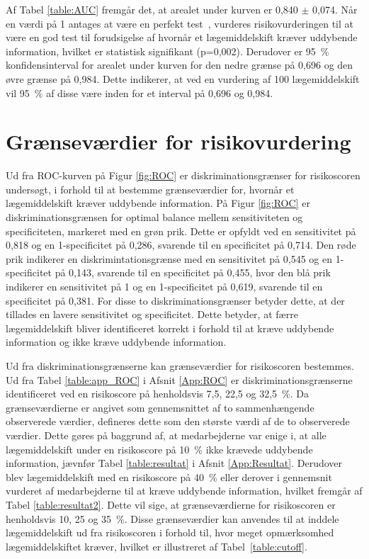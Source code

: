 Af Tabel \ref{table:AUC} fremgår det, at arealet under kurven er 0,840 $\pm$ 0,074. Når en værdi på 1 antages at være en perfekt test~\citep{Greiner2000}, vurderes risikovurderingen til at være en god test til forudsigelse af hvornår et lægemiddelskift kræver uddybende information, hvilket er statistisk signifikant (p=0,002). Derudover er 95~\% konfidensinterval for arealet under kurven for den nedre grænse på 0,696 og den øvre grænse på 0,984. Dette indikerer, at ved en vurdering af 100 lægemiddelskift vil 95~\% af disse være inden for et interval på 0,696 og 0,984.

\section{Grænseværdier for risikovurdering}
Ud fra ROC-kurven på Figur \ref{fig:ROC}  er diskriminationsgrænser for risikoscoren undersøgt, i forhold til at bestemme grænseværdier for, hvornår et lægemiddelskift kræver uddybende information. På Figur \ref{fig:ROC} er diskriminationsgrænsen for optimal balance mellem sensitiviteten og specificiteten, markeret med en grøn prik. Dette er opfyldt ved en sensitivitet på 0,818 og en 1-specificitet på 0,286, svarende til en specificitet på 0,714. Den røde prik indikerer en diskrimintationsgrænse med en sensitivitet på 0,545 og en 1-specificitet på 0,143, svarende til en specificitet på 0,455, hvor den blå prik indikerer en sensitivitet på 1 og en 1-specificitet på 0,619, svarende til en specificitet på 0,381. For disse to diskriminationsgrænser betyder dette, at der tillades en lavere sensitivitet og specificitet. Dette betyder, at færre lægemiddelskift bliver identificeret korrekt i forhold til at kræve uddybende information og ikke kræve uddybende information.


Ud fra diskriminationsgrænserne kan grænseværdier for risikoscoren bestemmes. Ud fra Tabel \ref{table:app_ROC} i Afsnit \ref{App:ROC} er diskriminationsgrænserne identificeret ved en risikoscore på  henholdsvis 7,5, 22,5 og 32,5~\%. Da grænseværdierne er angivet som gennemsnittet af to sammenhængende observerede værdier, defineres dette som den største værdi af de to observerede værdier. Dette gøres på baggrund af, at medarbejderne var enige i, at alle lægemiddelskift under en risikoscore på 10~\% ikke krævede uddybende information, jævnfør Tabel \ref{table:resultat} i Afsnit \ref{App:Resultat}. Derudover blev
lægemiddelskift med en risikoscore på 40~\% eller derover i gennemsnit vurderet af medarbejderne til at kræve uddybende information, hvilket fremgår af Tabel \ref{table:resultat2}. Dette vil sige, at grænseværdierne for risikoscoren er henholdsvis 10, 25 og 35~\%. Disse grænseværdier kan anvendes til at inddele lægemiddelskift ud fra risikoscoren i forhold til, hvor meget opmærksomhed lægemiddelskiftet kræver, hvilket er illustreret af Tabel~\ref{table:cutoff}.


